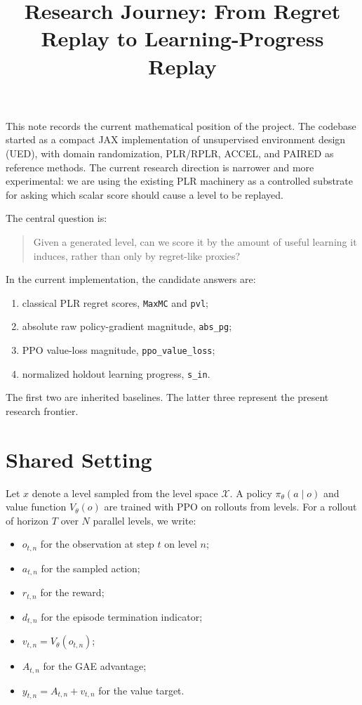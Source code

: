 \documentclass[11pt]{article}
\title{Research Journey: From Regret Replay to Learning-Progress Replay}
\author{}
\date{}
\begin{document}
\maketitle

This note records the current mathematical position of the project. The codebase
started as a compact JAX implementation of unsupervised environment design
(UED), with domain randomization, PLR/RPLR, ACCEL, and PAIRED as reference
methods. The current research direction is narrower and more experimental:
we are using the existing PLR machinery as a controlled substrate for asking
which scalar score should cause a level to be replayed.

The central question is:
\begin{quote}
Given a generated level, can we score it by the amount of useful learning it
induces, rather than only by regret-like proxies?
\end{quote}

In the current implementation, the candidate answers are:
\begin{enumerate}[leftmargin=*]
  \item classical PLR regret scores, \texttt{MaxMC} and \texttt{pvl};
  \item absolute raw policy-gradient magnitude, \texttt{abs\_pg};
  \item PPO value-loss magnitude, \texttt{ppo\_value\_loss};
  \item normalized holdout learning progress, \texttt{s\_in}.
\end{enumerate}

The first two are inherited baselines. The latter three represent the present
research frontier.

\section{Shared Setting}

Let $x$ denote a level sampled from the level space $\mathcal{X}$. A policy
$\pi_\theta(a \mid o)$ and value function $V_\theta(o)$ are trained with PPO
on rollouts from levels. For a rollout of horizon $T$ over $N$ parallel
levels, we write:
\begin{itemize}[leftmargin=*]
  \item $o_{t,n}$ for the observation at step $t$ on level $n$;
  \item $a_{t,n}$ for the sampled action;
  \item $r_{t,n}$ for the reward;
  \item $d_{t,n}$ for the episode termination indicator;
  \item $v_{t,n} = V_\theta(o_{t,n})$;
  \item $A_{t,n}$ for the GAE advantage;
  \item $y_{t,n} = A_{t,n} + v_{t,n}$ for the value target.
\end{itemize}
\end{document}
